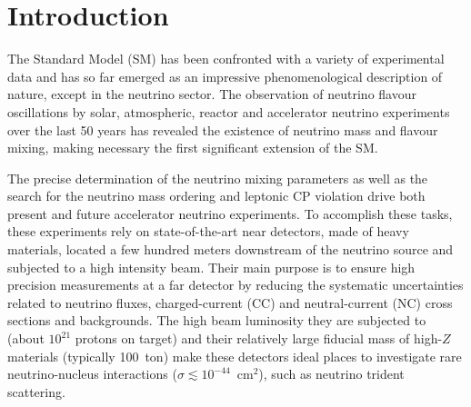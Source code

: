 
\graphicspath{{}{tridentSM/figs/}{tridentSM/}}

\section{Introduction}
\label{sec:intro}

The Standard Model (SM) has been confronted with a variety of experimental data and has so far emerged as an impressive phenomenological description of nature, except in the neutrino sector. The observation of neutrino flavour oscillations by solar, atmospheric, reactor and accelerator neutrino experiments over the last 50 years has revealed the existence of neutrino mass and flavour mixing, making necessary the first significant extension of the SM.

The precise determination of the neutrino mixing parameters as well as the search for the neutrino mass ordering and leptonic CP violation drive both present and future accelerator neutrino experiments. To accomplish these tasks, these experiments rely on state-of-the-art near detectors, made of heavy materials, located a few hundred meters downstream of the neutrino source and subjected to a high intensity beam. Their main purpose is to ensure high precision measurements at a far detector by reducing the systematic uncertainties related to neutrino fluxes, charged-current (CC) and neutral-current (NC) cross sections and backgrounds.  
%
The high beam luminosity they are subjected to (about $10^{21}$ protons on target) and their relatively large fiducial mass of high-$Z$ materials (typically 100~ton) make these detectors ideal places to investigate rare neutrino-nucleus interactions ($\sigma\lesssim 10^{-44}$~cm${}^2$), such as neutrino trident scattering. 

